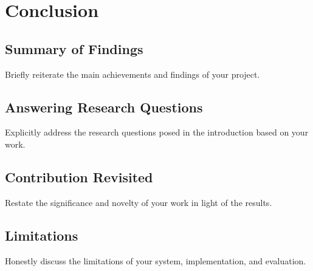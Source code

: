 \chapter{Conclusion}
    \section{Summary of Findings} Briefly reiterate the main achievements and findings of your project.
    \section{Answering Research Questions} Explicitly address the research questions posed in the introduction based on your work.
    \section{Contribution Revisited} Restate the significance and novelty of your work in light of the results.
    \section{Limitations} Honestly discuss the limitations of your system, implementation, and evaluation.